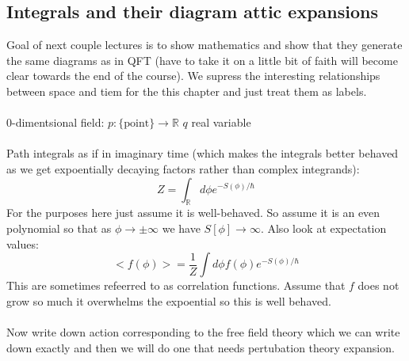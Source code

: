 \documentclass{article}
\begin{document}
\subsection{Integrals and their diagram attic expansions}
Goal of next couple lectures is to show mathematics and show that they generate the same diagrams as in QFT (have to take it on a little bit of faith will become clear towards the end of the course). We supress the interesting relationships between space and tiem for the this chapter and just treat them as labels.\\\\
0-dimentsional field: $p: \{ \text{point} \} \rightarrow \mathbb{R}$ $q$ real variable\\\\
Path integrals as if in imaginary time (which makes the integrals better behaved as we get expoentially decaying factors rather than complex integrands):
$$
Z = \int_{\mathbb{R}} d\phi e^{- S(\phi)/\hbar}
$$
For the purposes here just assume it is well-behaved. So assume it is an even polynomial so that as $\phi\rightarrow\pm \infty$ we have $S[\phi] \rightarrow \infty$. Also look at expectation values:
$$
< f(\phi) > = \frac{1}{Z} \int d\phi f(\phi) e^{-S(\phi)/\hbar}
$$
This are sometimes refeerred to as correlation functions. Assume that $f$ does not grow so much it overwhelms the expoential so this is well behaved. \\\\
Now write down action corresponding to the free field theory which we can write down exactly and then we will do one that needs pertubation theory expansion.
\end{document}
